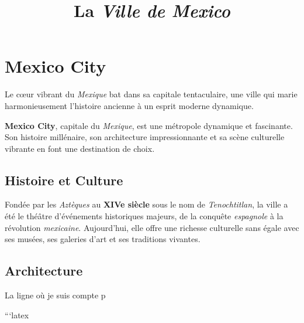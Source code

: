 \documentclass[12pt, a4paper]{article}
\title{La \textit{Ville de Mexico}}
\author{}
\date{}
\begin{document}
\maketitle

\section*{\textbf{Mexico City}}

Le cœur vibrant du \textit{Mexique} bat dans sa capitale tentaculaire, une ville qui marie harmonieusement l'histoire ancienne à un esprit moderne dynamique.

\textbf{Mexico City}, capitale du \textit{Mexique}, est une métropole dynamique et fascinante. Son histoire millénaire, son architecture impressionnante et sa scène culturelle vibrante en font une destination de choix.

\subsection*{\textbf{Histoire et Culture}}

Fondée par les \textit{Aztèques} au \textbf{XIVe siècle} sous le nom de \textit{Tenochtitlan}, la ville a été le théâtre d'événements historiques majeurs, de la conquête \textit{espagnole} à la révolution \textit{mexicaine}. Aujourd'hui, elle offre une richesse culturelle sans égale avec ses musées, ses galeries d'art et ses traditions vivantes.

\subsection*{\textbf{Architecture}}

La ligne où je suis compte p

```latex
\end{document}

